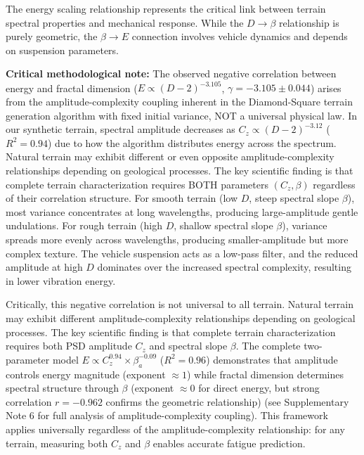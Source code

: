\documentclass[11pt,letterpaper]{article}
\begin{document}
The energy scaling relationship represents the critical link between terrain spectral properties and mechanical response. While the $D \rightarrow \beta$ relationship is purely geometric, the $\beta \rightarrow E$ connection involves vehicle dynamics and depends on suspension parameters. 

\textbf{Critical methodological note:} The observed negative correlation between energy and fractal dimension ($E \propto (D-2)^{-3.105}$, $\gamma = -3.105 \pm 0.044$) arises from the amplitude-complexity coupling inherent in the Diamond-Square terrain generation algorithm with fixed initial variance, NOT a universal physical law. In our synthetic terrain, spectral amplitude decreases as $C_z \propto (D-2)^{-3.12}$ ($R^2 = 0.94$) due to how the algorithm distributes energy across the spectrum. Natural terrain may exhibit different or even opposite amplitude-complexity relationships depending on geological processes. The key scientific finding is that complete terrain characterization requires BOTH parameters $(C_z, \beta)$ regardless of their correlation structure. For smooth terrain (low $D$, steep spectral slope $\beta$), most variance concentrates at long wavelengths, producing large-amplitude gentle undulations. For rough terrain (high $D$, shallow spectral slope $\beta$), variance spreads more evenly across wavelengths, producing smaller-amplitude but more complex texture. The vehicle suspension acts as a low-pass filter, and the reduced amplitude at high $D$ dominates over the increased spectral complexity, resulting in lower vibration energy.

Critically, this negative correlation is not universal to all terrain. Natural terrain may exhibit different amplitude-complexity relationships depending on geological processes. The key scientific finding is that complete terrain characterization requires both PSD amplitude $C_z$ and spectral slope $\beta$. The complete two-parameter model $E \propto C_z^{0.94} \times \beta_a^{-0.09}$ ($R^2 = 0.96$) demonstrates that amplitude controls energy magnitude (exponent $\approx 1$) while fractal dimension determines spectral structure through $\beta$ (exponent $\approx 0$ for direct energy, but strong correlation $r=-0.962$ confirms the geometric relationship) (see Supplementary Note 6 for full analysis of amplitude-complexity coupling). This framework applies universally regardless of the amplitude-complexity relationship: for any terrain, measuring both $C_z$ and $\beta$ enables accurate fatigue prediction.
\end{document}
